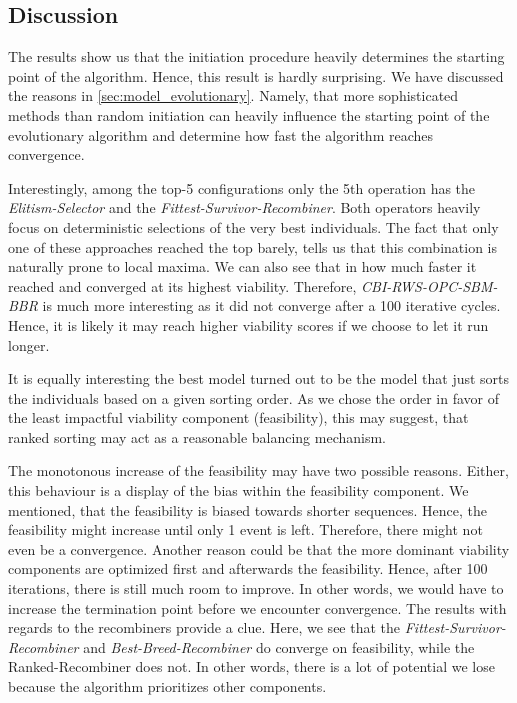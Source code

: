 \documentclass[./../../paper.tex]{subfiles}
\begin{document}
\subsection{Discussion}

The results show us that the initiation procedure heavily determines the starting point of the algorithm. Hence, this result is hardly surprising. We have discussed the reasons in \autoref{sec:model_evolutionary}. Namely, that more sophisticated methods than random initiation can heavily influence the starting point of the evolutionary algorithm and determine how fast the algorithm reaches convergence. 

Interestingly, among the top-5 configurations only the 5th operation has the \emph{Elitism-Selector} and the \emph{Fittest-Survivor-Recombiner}. Both operators heavily focus on deterministic selections of the very best individuals. The fact that only one of these approaches reached the top barely, tells us that this combination is naturally prone to local maxima. We can also see that in how much faster it reached and converged at its highest viability. Therefore, \emph{CBI-RWS-OPC-SBM-BBR} is much more interesting as it did not converge after a 100 iterative cycles. Hence, it is likely it may reach higher viability scores if we choose to let it run longer.

It is equally interesting the best model turned out to be the model that just sorts the individuals based on a given sorting order. As we chose the order in favor of the least impactful viability component (feasibility), this may suggest, that ranked sorting may act as a reasonable balancing mechanism. 

The monotonous increase of the feasibility may have two possible reasons. Either, this behaviour is a display of the bias within the feasibility component. We mentioned, that the feasibility is biased towards shorter sequences. Hence, the feasibility might increase until only 1 event is left. Therefore, there might not even be a convergence. Another reason could be that the more dominant viability components are optimized first and afterwards the feasibility. Hence, after 100 iterations, there is still much room to improve. In other words, we would have to increase the termination point before we encounter convergence. The results with regards to the recombiners provide a clue. Here, we see that the \emph{Fittest-Survivor-Recombiner} and \emph{Best-Breed-Recombiner} do converge on feasibility, while the {Ranked-Recombiner} does not. In other words, there is a lot of potential we lose because the algorithm prioritizes other components. 
\end{document}
